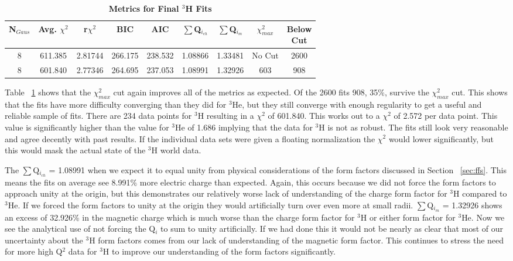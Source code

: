 \begin{table}[!h]
\centering
\begin{tabular}{|c c c c c c c c c|}
\hline
\textbf{N$_{Gaus}$} & \textbf{Avg. $\chi^2$} & \textbf{r$\chi^2$} & \textbf{BIC} & \textbf{AIC} & \textbf{$\sum$Q$_{i_{ch}}$} & \textbf{$\sum$Q$_{i_{m}}$} & \textbf{$\chi^2_{max}$} & \makecell{\textbf{Below}\\ \textbf{Cut}} \\
\hline
8 & 611.385 & 2.81744 & 266.175 & 238.532 & 1.08866 & 1.33481 & No Cut & 2600\\
8 & 601.840 & 2.77346 & 264.695 & 237.053 & 1.08991 & 1.32926 & 603 & 908\\
\hline
\end{tabular}
\caption{\bf{Metrics for Final $^3$H Fits}}
\label{tab:3h_fits}
\end{table}

Table ~\ref{tab:3h_fits} shows that the $\chi^2_{max}$ cut again improves all of the metrics as expected. Of the 2600 fits 908, 35$\%$, survive the $\chi^2_{max}$ cut. This shows that the fits have more difficulty converging than they did for $^3$He, but they still converge with enough regularity to get a useful and reliable sample of fits. There are 234 data points for $^3$H resulting in a $\chi^2$ of 601.840. This works out to a $\chi^2$ of 2.572 per data point. This value is significantly higher than the value for $^3$He of 1.686 implying that the data for $^3$H is not as robust. The fits still look very reasonable and agree decently with past results. If the individual data sets were given a floating normalization the $\chi^2$ would lower significantly, but this would mask the actual state of the $^3$H world data. 

The $\sum$Q$_{i_{ch}}$ = 1.08991 when we expect it to equal unity from physical considerations of the form factors discussed in Section ~\ref{sec:ffs}. This means the fits on average see 8.991$\%$ more electric charge than expected. Again, this occurs because we did not force the form factors to approach unity at the origin, but this demonstrates our relatively worse lack of understanding of the charge form factor for $^3$H compared to $^3$He. If we forced the form factors to unity at the origin they would artificially turn over even more at small radii. $\sum$Q$_{i_{m}}$ = 1.32926 shows an excess of 32.926$\%$ in the magnetic charge which is much worse than the charge form factor for $^3$H or either form factor for $^3$He. Now we see the analytical use of not forcing the Q$_i$ to sum to unity artificially. If we had done this it would not be nearly as clear that most of our uncertainty about the $^3$H form factors comes from our lack of understanding of the magnetic form factor. This continues to stress the need for more high Q$^2$ data for $^3$H to improve our understanding of the form factors significantly.

